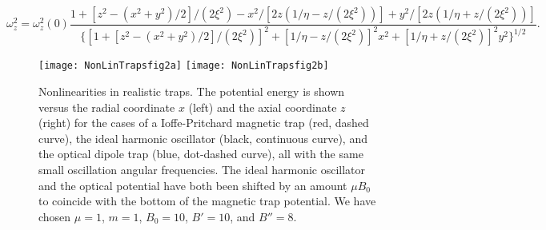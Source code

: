 \documentclass[pra,letterpaper,onecolumn,superscriptaddress,floatfix]{revtex4}
\begin{document}
\begin{equation}
\omega_z^2= \omega_z^2(0) \frac{1+[z^2-(x^2+y^2)/2]/(2\xi^2)-x^2/[2z(1/\eta-z/(2\xi^2))]+
y^2/[2z(1/\eta+z/(2\xi^2))]}
{\{[1+[z^2-(x^2+y^2)/2]/(2\xi^2)]^2+[1/\eta-z/(2\xi^2)]^2x^2+[1/\eta+z/(2\xi^2)]^2y^2\}^{1/2}}.
\tag{4c}
\label{4c}
\end{equation}

\begin{figure}[t]
\texttt{[image: NonLinTrapsfig2a]}
\texttt{[image: NonLinTrapsfig2b]}
\caption{Nonlinearities in realistic traps. The potential energy is shown versus the radial coordinate 
$x$ (left) and the axial coordinate $z$ (right) for the cases of a Ioffe-Pritchard magnetic trap 
(red, dashed curve), the ideal harmonic oscillator (black, continuous curve), and the optical dipole trap 
(blue, dot-dashed curve), all with the same small oscillation angular frequencies. 
The ideal harmonic oscillator and the optical potential have both been shifted by an amount 
$\mu B_0$ to coincide with the bottom of the magnetic trap potential. 
We have chosen $\mu=1$, $m=1$, $B_0=10$, $B'=10$, and $B''=8$.}
\label{Fig2}
\end{figure}
\end{document}
